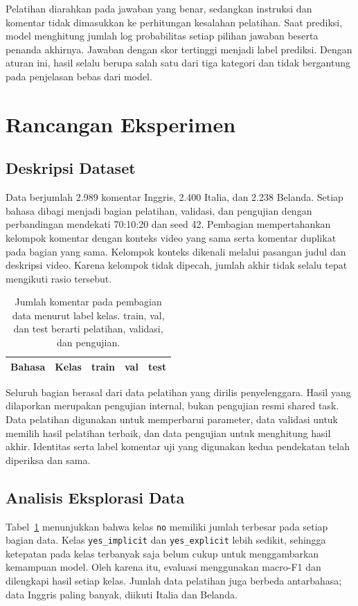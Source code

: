 \documentclass[11pt]{article}
\begin{document}
Pelatihan diarahkan pada jawaban yang benar, sedangkan instruksi dan komentar tidak dimasukkan ke perhitungan kesalahan pelatihan. Saat prediksi, model menghitung jumlah log probabilitas setiap pilihan jawaban beserta penanda akhirnya. Jawaban dengan skor tertinggi menjadi label prediksi. Dengan aturan ini, hasil selalu berupa salah satu dari tiga kategori dan tidak bergantung pada penjelasan bebas dari model.

\section{Rancangan Eksperimen}
\subsection{Deskripsi Dataset}
Data berjumlah 2.989 komentar Inggris, 2.400 Italia, dan 2.238 Belanda. Setiap bahasa dibagi menjadi bagian pelatihan, validasi, dan pengujian dengan perbandingan mendekati 70:10:20 dan seed 42. Pembagian mempertahankan kelompok komentar dengan konteks video yang sama serta komentar duplikat pada bagian yang sama. Kelompok konteks dikenali melalui pasangan judul dan deskripsi video. Karena kelompok tidak dipecah, jumlah akhir tidak selalu tepat mengikuti rasio tersebut.

\begin{table}[t]
\centering
\small
\setlength{\tabcolsep}{3pt}
\begin{tabular}{llrrr}
\toprule
Bahasa & Kelas & train & val & test \\
\midrule

\end{tabular}
\caption{Jumlah komentar pada pembagian data menurut label kelas. train, val, dan test berarti pelatihan, validasi, dan pengujian.}
\label{tab:data}
\end{table}

Seluruh bagian berasal dari data pelatihan yang dirilis penyelenggara. Hasil yang dilaporkan merupakan pengujian internal, bukan pengujian resmi shared task. Data pelatihan digunakan untuk memperbarui parameter, data validasi untuk memilih hasil pelatihan terbaik, dan data pengujian untuk menghitung hasil akhir. Identitas serta label komentar uji yang digunakan kedua pendekatan telah diperiksa dan sama.

\subsection{Analisis Eksplorasi Data}
Tabel~\ref{tab:data} menunjukkan bahwa kelas \texttt{no} memiliki jumlah terbesar pada setiap bagian data. Kelas \texttt{yes\_implicit} dan \texttt{yes\_explicit} lebih sedikit, sehingga ketepatan pada kelas terbanyak saja belum cukup untuk menggambarkan kemampuan model. Oleh karena itu, evaluasi menggunakan macro-F1 dan dilengkapi hasil setiap kelas. Jumlah data pelatihan juga berbeda antarbahasa; data Inggris paling banyak, diikuti Italia dan Belanda.
\end{document}
